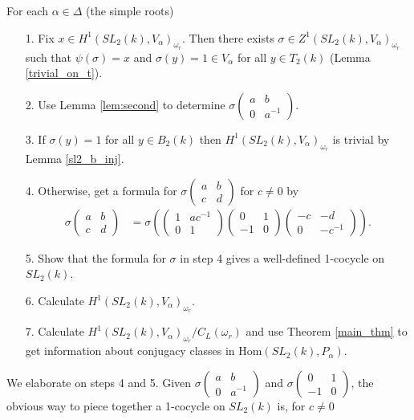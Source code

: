 For each $\alpha \in \Delta$ (the simple roots)
	\begin{itemize}
	\item[1.] Fix $x\in H^1(SL_2(k), V_\alpha)_{\omega_r}$. Then there exists $\sigma\in Z^1(SL_2(k), V_\alpha)_{\omega_r}$ such that $\psi(\sigma) = x$ and $\sigma\left(y\right) = 1 \in V_\alpha$ for all $y\in T_2(k)$ (Lemma \ref{trivial_on_t}).
	\item[2.] Use Lemma \ref{lem:second} to determine $\sigma\left(\begin{matrix}a & b\\0 & a^{-1}\end{matrix}\right)$. 
	\item[3.] If $\sigma\left(y\right) = 1$ for all $y\in B_2(k)$ then $H^1(SL_2(k), V_\alpha)_{\omega_r}$ is trivial by Lemma \ref{sl2_b_inj}.
	\item[4.] Otherwise, get a formula for $\sigma\left(\begin{matrix}a & b\\c & d\end{matrix}\right)$ for $c \neq 0$ by
	\begin{align*}
	\sigma\left(\begin{matrix}a & b\\c & d\end{matrix}\right) &= \sigma\left(
			\left(\begin{matrix}1 & ac^{-1}\\0 & 1\end{matrix}\right)
			\left(\begin{matrix}0 & 1\\-1 & 0\end{matrix}\right)
			\left(\begin{matrix}-c & -d\\0 & -c^{-1}\end{matrix}\right)
			\right).
	\end{align*}
	\item[5.] Show that the formula for $\sigma$ in step 4 gives a well-defined 1-cocycle on $SL_2(k)$.
	\item[6.] Calculate $H^1(SL_2(k), V_\alpha)_{\omega_r}$.
	\item[7.] Calculate $H^1(SL_2(k), V_\alpha)_{\omega_r}/C_L(\omega_r)$ and use Theorem \ref{main_thm} to get information about conjugacy classes in $\mathrm{Hom}(SL_2(k), P_\alpha)$.
	\end{itemize}
We elaborate on steps 4 and 5. Given $\sigma\left(\begin{matrix}a & b \\ 0 & a^{-1}\end{matrix}\right)$ and $\sigma\left(\begin{matrix}0 & 1\\-1 & 0\end{matrix}\right)$, the obvious way to piece together a 1-cocycle on $SL_2(k)$ is, for $c\neq 0$
